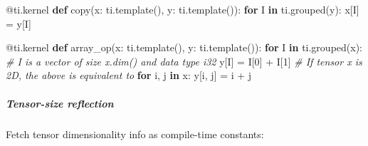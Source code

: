 \documentclass[11pt]{article}
\newenvironment{Shaded}{}{}
\newcommand{\KeywordTok}[1]{\textcolor[rgb]{0.00,0.44,0.13}{\textbf{{#1}}}}
\newcommand{\DecValTok}[1]{\textcolor[rgb]{0.25,0.63,0.44}{{#1}}}
\newcommand{\CommentTok}[1]{\textcolor[rgb]{0.38,0.63,0.69}{\textit{{#1}}}}
\newcommand{\NormalTok}[1]{{#1}}
\newcommand{\ControlFlowTok}[1]{\textcolor[rgb]{0.00,0.44,0.13}{\textbf{{#1}}}}
\newcommand{\OperatorTok}[1]{\textcolor[rgb]{0.40,0.40,0.40}{{#1}}}
\newcommand{\AttributeTok}[1]{\textcolor[rgb]{0.49,0.56,0.16}{{#1}}}
\begin{document}
\begin{Shaded}
\begin{Highlighting}[]
\AttributeTok{@ti.kernel}
\KeywordTok{def}\NormalTok{ copy(x: ti.template(), y: ti.template()):}
    \ControlFlowTok{for}\NormalTok{ I }\KeywordTok{in}\NormalTok{ ti.grouped(y):}
\NormalTok{        x[I] }\OperatorTok{=}\NormalTok{ y[I]}


\AttributeTok{@ti.kernel}
\KeywordTok{def}\NormalTok{ array\_op(x: ti.template(), y: ti.template()):}
    \ControlFlowTok{for}\NormalTok{ I }\KeywordTok{in}\NormalTok{ ti.grouped(x):}
        \CommentTok{\# I is a vector of size x.dim() and data type i32}
\NormalTok{        y[I] }\OperatorTok{=}\NormalTok{ I[}\DecValTok{0}\NormalTok{] }\OperatorTok{+}\NormalTok{ I[}\DecValTok{1}\NormalTok{]}
    \CommentTok{\# If tensor x is 2D, the above is equivalent to}
    \ControlFlowTok{for}\NormalTok{ i, j }\KeywordTok{in}\NormalTok{ x:}
\NormalTok{        y[i, j] }\OperatorTok{=}\NormalTok{ i }\OperatorTok{+}\NormalTok{ j}
\end{Highlighting}
\end{Shaded}

    \hypertarget{tensor-size-reuxfb02ection}{%
\subparagraph{Tensor-size reﬂection}\label{tensor-size-reuxfb02ection}}

Fetch tensor dimensionality info as compile-time constants:
\end{document}
